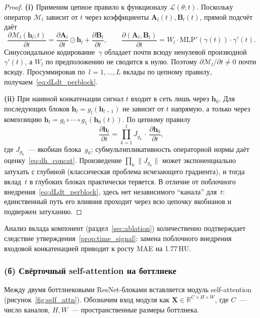 \begin{proof}
\textbf{(i)} Применим цепное правило к функционалу $\mathcal{L}(\theta;t)$. Поскольку оператор $\mathcal{M}_l$ зависит от $t$ через коэффициенты $\mathbf{A}_l(t),\mathbf{B}_l(t)$, прямой подсчёт даёт
\[
    \frac{\partial \mathcal{M}_l(\mathbf{h}_l;t)}{\partial t}
    = \frac{\partial \mathbf{A}_l}{\partial t}\odot\mathbf{h}_l + \frac{\partial \mathbf{B}_l}{\partial t}, \qquad
    \frac{\partial (\mathbf{A}_l,\mathbf{B}_l)}{\partial t} = W_l\cdot\mathrm{MLP}'(\gamma(t))\cdot\gamma'(t).
\]
Синусоидальное кодирование~$\gamma$ обладает почти всюду ненулевой производной $\gamma'(t)$, а $W_l$ по предположению не сводится к нулю. Поэтому $\partial\mathcal{M}_l/\partial t\neq 0$ почти всюду. Просуммировав по~$l=1,\ldots,L$ вклады по цепному правилу, получаем~\eqref{eq:dLdt_perblock}.

\textbf{(ii)} При наивной конкатенации сигнал $t$ входит в сеть лишь через $\mathbf{h}_0$. Для последующих блоков $\mathbf{h}_l = g_l(\mathbf{h}_{l-1})$ не зависит от $t$ напрямую, а только через композицию $\mathbf{h}_l = g_l\circ\cdots\circ g_1(\mathbf{h}_0(t))$. По цепному правилу
\[
    \frac{\partial \mathbf{h}_l}{\partial t} = \prod_{k=1}^{l} J_{g_k}\,\cdot\,\frac{\partial \mathbf{h}_0}{\partial t},
\]
где $J_{g_k}$~--- якобиан блока~$g_k$; субмультипликативность операторной нормы даёт оценку~\eqref{eq:dh_concat}. Произведение $\prod_k\lVert J_{g_k}\rVert$ может экспоненциально затухать с глубиной (классическая проблема исчезающего градиента), и тогда вклад~$t$ в глубоких блоках практически теряется. В отличие от поблочного внедрения~\eqref{eq:dLdt_perblock}, здесь нет независимого ``канала'' для~$t$: единственный путь его влияния проходит через всю цепочку якобианов и подвержен затуханию.
\end{proof}

Анализ вклада компонент (раздел~\ref{sec:ablation}) количественно подтверждает следствие утверждения~\ref{prop:time_signal}: замена поблочного внедрения входовой конкатенацией приводит к росту MAE на 1.77\,HU.

\subsubsection{(б) Свёрточный self-attention на боттлнеке}

Между двумя боттлнековыми ResNet-блоками вставляется модуль self-attention~\cite{yang-etal-2019-convolutional} (рисунок~\ref{fig:self_attn}). Обозначим вход модуля как $\mathbf{X}\in\mathbb{R}^{C\times H\times W}$, где $C$~--- число каналов, $H,W$~--- пространственные размеры боттлнека.

